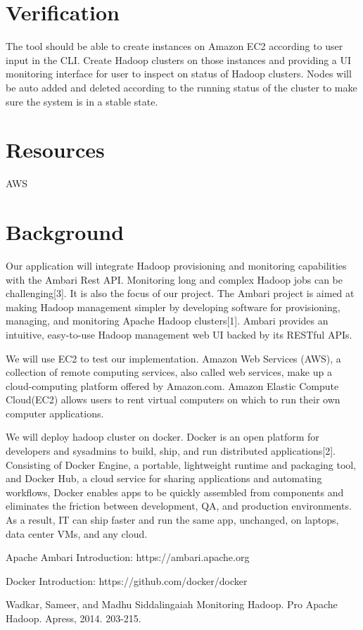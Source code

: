 \documentclass{article}
\begin{document}
\section{Verification}

The tool should be able to create instances on Amazon EC2 according to user input in the CLI. Create Hadoop clusters on those instances and providing a UI monitoring interface for user to inspect on status of Hadoop clusters.  Nodes will be auto added and deleted according to the running status of the cluster to make sure the system is in a stable state.


\section{Resources}
AWS

\section{Background}
Our application will integrate Hadoop provisioning and monitoring capabilities with the Ambari Rest API. Monitoring long and complex Hadoop jobs can be challenging[3]. It is also the focus of our project. The Ambari project is aimed at making Hadoop management simpler by developing software for provisioning, managing, and monitoring Apache Hadoop clusters[1]. Ambari provides an intuitive, easy-to-use Hadoop management web UI backed by its RESTful APIs.

We will use EC2 to test our implementation. Amazon Web Services (AWS), a collection of remote computing services, also called web services, make up a cloud-computing platform offered by Amazon.com. Amazon Elastic Compute Cloud(EC2) allows users to rent virtual computers on which to run their own computer applications.

We will deploy hadoop cluster on docker. Docker is an open platform for developers and sysadmins to build, ship, and run distributed applications[2]. Consisting of Docker Engine, a portable, lightweight runtime and packaging tool, and Docker Hub, a cloud service for sharing applications and automating workflows, Docker enables apps to be quickly assembled from components and eliminates the friction between development, QA, and production environments. As a result, IT can ship faster and run the same app, unchanged, on laptops, data center VMs, and any cloud.

\begin{thebibliography}{2}

Apache Ambari Introduction: https://ambari.apache.org


Docker Introduction: https://github.com/docker/docker



Wadkar, Sameer, and Madhu Siddalingaiah
\newblock Monitoring Hadoop.
\newblock  Pro Apache Hadoop. Apress, 2014. 203-215.





\end{thebibliography}
\end{document}
